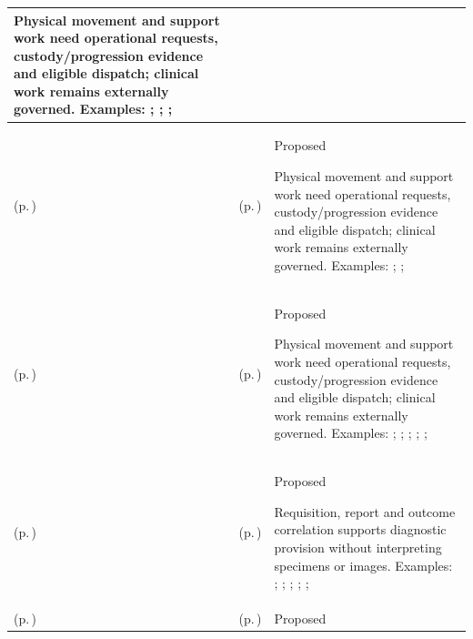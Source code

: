\begin{longtable}{|>{\raggedright\arraybackslash}p{0.27\TableWidth}|>{\raggedright\arraybackslash}p{0.27\TableWidth}|>{\raggedright\arraybackslash}p{0.46\TableWidth}|}
Physical movement and support work need operational requests, custody/progression evidence and eligible dispatch; clinical work remains externally governed. Examples: \nameref{feature:feat-hso-24}; \nameref{feature:feat-hso-25}; \nameref{function:manage-patient-transport-progression}; \nameref{service:patient-transport-tracking-service}\\\hline
\nameref{cap:bc-care-support-logistics-management} (p.\,\pageref{cap:bc-care-support-logistics-management}) & \nameref{cap:bec-clinical-logistics-coordination} (p.\,\pageref{cap:bec-clinical-logistics-coordination}) & Proposed

Physical movement and support work need operational requests, custody/progression evidence and eligible dispatch; clinical work remains externally governed. Examples: \nameref{feature:feat-hso-26}; \nameref{function:manage-specimen-transport-progression}; \nameref{service:specimen-transit-tracking-service}\\\hline
\nameref{cap:bc-care-support-logistics-management} (p.\,\pageref{cap:bc-care-support-logistics-management}) & \nameref{cap:bec-work-allocation-dispatch} (p.\,\pageref{cap:bec-work-allocation-dispatch}) & Proposed

Physical movement and support work need operational requests, custody/progression evidence and eligible dispatch; clinical work remains externally governed. Examples: \nameref{feature:feat-hso-19}; \nameref{feature:feat-hso-20}; \nameref{feature:feat-hso-21}; \nameref{feature:feat-hso-22}; \nameref{function:dispatch-operational-work-order}; \nameref{service:work-dispatch-service}\\\hline
\nameref{cap:bc-diagnostic-support-provision} (p.\,\pageref{cap:bc-diagnostic-support-provision}) & \nameref{cap:bec-diagnostic-administration} (p.\,\pageref{cap:bec-diagnostic-administration}) & Proposed

Requisition, report and outcome correlation supports diagnostic provision without interpreting specimens or images. Examples: \nameref{feature:feat-sa-15}; \nameref{feature:feat-sa-16}; \nameref{feature:feat-sa-17}; \nameref{function:correlate-diagnostic-request}; \nameref{service:diagnostic-correlation-resolution}; \nameref{function:bind-diagnostic-report}\\\hline
\nameref{cap:bc-diagnostic-support-provision} (p.\,\pageref{cap:bc-diagnostic-support-provision}) & \nameref{cap:bec-diagnostic-services} (p.\,\pageref{cap:bec-diagnostic-services}) & Proposed


\end{longtable}
